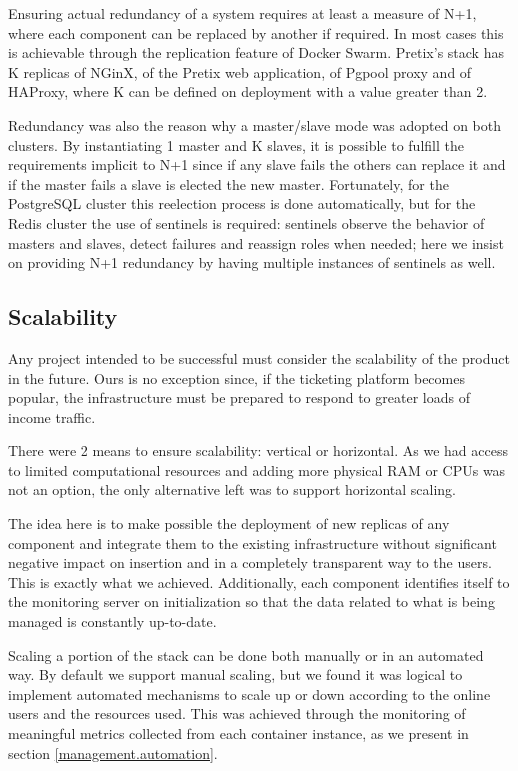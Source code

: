\documentclass[12pt]{article}
\begin{document}
Ensuring actual redundancy of a system requires at least a measure of N+1, where each component can be replaced by another if required.
In most cases this is achievable through the replication feature of Docker Swarm.
Pretix's stack has K replicas of NGinX, of the Pretix web application, of Pgpool proxy and of HAProxy, where K can be defined on deployment with a value greater than 2.

Redundancy was also the reason why a master/slave mode was adopted on both clusters.
By instantiating 1 master and K slaves, it is possible to fulfill the requirements implicit to N+1 since if any slave fails the others can replace it and if the 
master fails a slave is elected the new master.
Fortunately, for the PostgreSQL cluster this reelection process is done automatically, but for the Redis cluster the use of sentinels is required: sentinels 
observe the behavior of masters and slaves, detect failures and reassign roles when needed; here we insist on providing N+1 redundancy by having multiple 
instances of sentinels as well.

\subsection{Scalability} \label{architecture.scalability} %


Any project intended to be successful must consider the scalability of the product in the future.
Ours is no exception since, if the ticketing platform becomes popular, the infrastructure must be prepared to respond to greater loads of income traffic.

There were 2 means to ensure scalability: vertical or horizontal.
As we had access to limited computational resources and adding more physical RAM or CPUs was not an option, the only alternative left was to support horizontal scaling.

The idea here is to make possible the deployment of new replicas of any component and integrate them to the existing infrastructure without significant negative 
impact on insertion and in a completely transparent way to the users.
This is exactly what we achieved.
Additionally, each component identifies itself to the monitoring server on initialization so that the data related to what is being managed is constantly up-to-date.

Scaling a portion of the stack can be done both manually or in an automated way.
By default we support manual scaling, but we found it was logical to implement automated mechanisms to scale up or down according to the online users and the 
resources used.
This was achieved through the monitoring of meaningful metrics collected from each container instance, as we present in section \ref{management.automation}.
\end{document}
